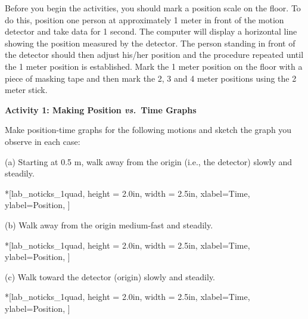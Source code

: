 Before you begin the activities, you should mark a position scale on the floor.
To do this, position one person at approximately 1 meter in front of the motion
detector and take data for 1 second. The computer will display a horizontal
line showing the position measured by the detector. The person standing in front
of the detector should then adjust his/her position and the procedure repeated
until the 1 meter position is established. Mark the 1 meter position on the
floor with a piece of masking tape and then mark the 2, 3 and 4 meter positions
using the 2 meter stick.

\textbf{Activity 1: Making Position \textit{vs.}~Time Graphs }

Make position-time graphs for the following motions and sketch the graph you
observe in each case:

(a) Starting at 0.5 m, walk away from the origin (i.e., the detector) slowly
and steadily.

\begin{lab_axis}*[lab_noticks_1quad,
	height = {2.0in}, width = {2.5in},
	xlabel={Time},
	ylabel={Position},
	]
\end{lab_axis}

(b) Walk away from the origin medium-fast and steadily.

\begin{lab_axis}*[lab_noticks_1quad,
	height = {2.0in}, width = {2.5in},
	xlabel={Time},
	ylabel={Position},
	]
\end{lab_axis}

(c) Walk toward the detector (origin) slowly and steadily.

\begin{lab_axis}*[lab_noticks_1quad,
	height = {2.0in}, width = {2.5in},
	xlabel={Time},
	ylabel={Position},
	]
\end{lab_axis}

